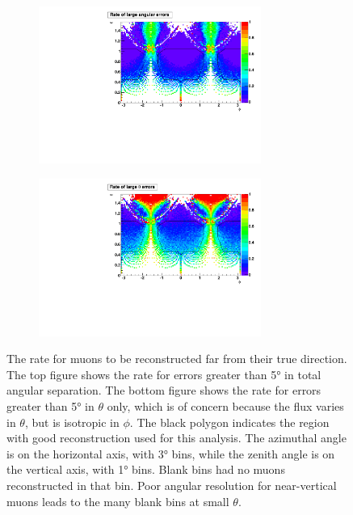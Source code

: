 \documentclass[herrin-thesis.tex]{subfiles}
\begin{document}
 \begin{figure}[htpb]
 \centering
 \begin{subfigure}[b]{1.0\textwidth}
 \centering
 \includegraphics[width=0.8\textwidth]{./plots/muon_misrecon_ang_rate.pdf}
 \end{subfigure}
  \begin{subfigure}[b]{1.0\textwidth}
  \centering
   \includegraphics[width=0.8\textwidth]{./plots/muon_misrecon_theta_rate.pdf}
  \end{subfigure}
 \caption[Rate of poorly reconstructed muons]{The rate for muons to be reconstructed far from their true direction. The top figure shows the rate for  errors greater than \ang{5} in total angular separation. The bottom figure shows the rate for errors greater than \ang{5} in \(\theta\) only, which is of concern because the flux varies in \(\theta\), but is isotropic in \(\phi\). The black polygon indicates the region with good reconstruction used for this analysis. The azimuthal angle is on the horizontal axis, with \ang{3} bins, while the zenith angle is on the vertical axis, with \ang{1} bins. Blank bins had no muons reconstructed in that bin. Poor angular resolution for near-vertical muons leads to the many blank bins at small \(\theta\).}
 \label{fig:muon_misrecon_rate}
 \end{figure}
\end{document}
